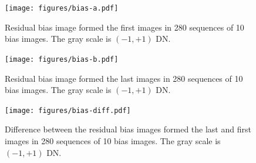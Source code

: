 \documentclass{article}
\begin{document}
\begin{figure}[pb]
\begin{center}
\texttt{[image: figures/bias-a.pdf]}
\medskip
\caption{Residual bias image formed the first images in 280 sequences of 10 bias images. The gray scale is $(-1,+1)$ DN.}
\label{figure:bias-a}
\end{center}
\begin{center}
\texttt{[image: figures/bias-b.pdf]}
\medskip
\caption{Residual bias image formed the last images in 280 sequences of 10 bias images. The gray scale is $(-1,+1)$ DN.}
\label{figure:bias-b}
\end{center}
\end{figure}

\begin{figure}[pb]
\begin{center}
\texttt{[image: figures/bias-diff.pdf]}
\medskip
\caption{Difference between the residual bias images formed the last and first images in 280 sequences of 10 bias images. The gray scale is $(-1,+1)$ DN.}
\label{figure:bias-diff}
\end{center}
\end{figure}
\end{document}
